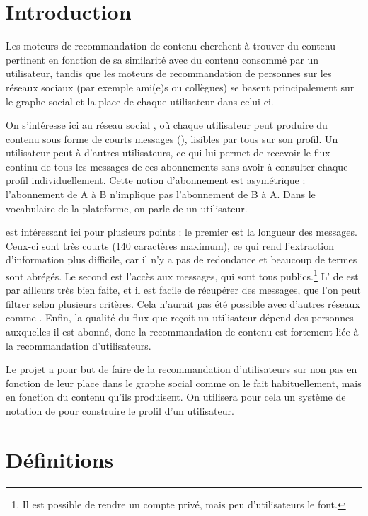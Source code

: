 
\section{Introduction}

Les moteurs de recommandation de contenu cherchent à trouver du contenu
pertinent en fonction de sa similarité avec du contenu consommé par un
utilisateur, tandis que les moteurs de recommandation de personnes sur les
réseaux sociaux (par exemple ami(e)s ou collègues) se basent principalement sur
le graphe social et la place de chaque utilisateur dans celui-ci.

On s’intéresse ici au réseau social \twt{}, où chaque utilisateur peut produire
du contenu sous forme de courts messages (\tweets{}), lisibles par tous sur son
profil. Un utilisateur peut  à d’autres utilisateurs, ce qui lui
permet de recevoir le flux continu de tous les messages de ces abonnements sans
avoir à consulter chaque profil individuellement. Cette notion d’abonnement est
asymétrique : l’abonnement de A à B n’implique pas l’abonnement de B à A. Dans
le vocabulaire de la plateforme, on parle de  un utilisateur.

\twt{} est intéressant ici pour plusieurs points : le premier est la longueur
des messages. Ceux-ci sont très courts (140 caractères maximum), ce qui rend
l’extraction d’information plus difficile, car il n’y a pas de redondance et
beaucoup de termes sont abrégés. Le second est l’accès aux messages, qui sont
tous publics.\footnote{Il est possible de rendre un compte privé, mais peu
d’utilisateurs le font.} L’\api{} de \twt{} est par ailleurs très bien faite,
et il est facile de récupérer des messages, que l’on peut filtrer selon
plusieurs critères. Cela n’aurait pas été possible avec d’autres réseaux comme
\fb{}. Enfin, la qualité du flux que reçoit un utilisateur dépend des personnes
auxquelles il est abonné, donc la recommandation de contenu est fortement liée
à la recommandation d’utilisateurs.

Le projet \tb{} a pour but de faire de la recommandation d’utilisateurs sur
\twt{} non pas en fonction de leur place dans le graphe social comme on le fait
habituellement, mais en fonction du contenu qu’ils produisent. On utilisera
pour cela un système de notation de \tweets{} pour construire le profil d’un
utilisateur.

\section{Définitions}

